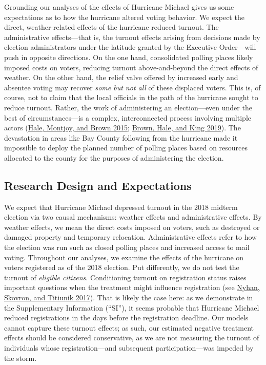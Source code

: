 \documentclass[
  12pt,
]{article}
\begin{document}
Grounding our analyses of the effects of Hurricane Michael gives us some expectations as to how the hurricane altered voting behavior. We expect the direct, weather-related effects of the hurricane reduced turnout. The administrative effects---that is, the turnout effects arising from decisions made by election administrators under the latitude granted by the Executive Order---will push in opposite directions. On the one hand, consolidated polling places likely imposed costs on voters, reducing turnout above-and-beyond the direct effects of weather. On the other hand, the relief valve offered by increased early and absentee voting may recover \emph{some but not all} of these displaced voters. This is, of course, not to claim that the local officials in the path of the hurricane sought to reduce turnout. Rather, the work of administering an election---even under the best of circumstances---is a complex, interconnected process involving multiple actors (\protect\hyperlink{ref-Hale2015}{Hale, Montjoy, and Brown 2015}; \protect\hyperlink{ref-Brown2019}{Brown, Hale, and King 2019}). The devastation in areas like Bay County following from the hurricane made it impossible to deploy the planned number of polling places based on resources allocated to the county for the purposes of administering the election.

\hypertarget{research-design-and-expectations}{%
\subsection*{Research Design and Expectations}\label{research-design-and-expectations}}

We expect that Hurricane Michael depressed turnout in the 2018 midterm election via two causal mechanisms: weather effects and administrative effects. By weather effects, we mean the direct costs imposed on voters, such as destroyed or damaged property and temporary relocation. Administrative effects refer to how the election was run such as closed polling places and increased access to mail voting. Throughout our analyses, we examine the effects of the hurricane on voters registered as of the 2018 election. Put differently, we do not test the turnout of \emph{eligible citizens}. Conditioning turnout on registration status raises important questions when the treatment might influence registration (see \protect\hyperlink{ref-Nyhan2017}{Nyhan, Skovron, and Titiunik 2017}). That is likely the case here: as we demonstrate in the Supplementary Information (``SI''), it seems probable that Hurricane Michael reduced registrations in the days before the registration deadline. Our models cannot capture these turnout effects; as such, our estimated negative treatment effects should be considered conservative, as we are not measuring the turnout of individuals whose registration---and subsequent participation---was impeded by the storm.
\end{document}
